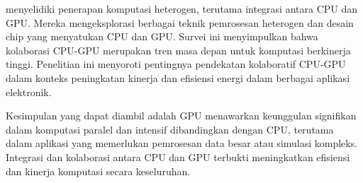 \cite{buiHeterogeneousComputingRealWorld2021} menyelidiki penerapan komputasi heterogen,
terutama integrasi antara CPU dan GPU. Mereka mengeksplorasi berbagai teknik pemrosesan
heterogen dan desain chip yang menyatukan CPU dan GPU. Survei ini menyimpulkan
bahwa kolaborasi CPU-GPU merupakan tren masa depan untuk komputasi berkinerja
tinggi. Penelitian ini menyoroti pentingnya pendekatan kolaboratif CPU-GPU dalam
konteks peningkatan kinerja dan efisiensi energi dalam berbagai aplikasi elektronik.

Kesimpulan yang dapat diambil adalah GPU menawarkan keunggulan signifikan dalam
komputasi paralel dan intensif dibandingkan dengan CPU, terutama dalam aplikasi
yang memerlukan pemrosesan data besar atau simulasi kompleks. Integrasi dan
kolaborasi antara CPU dan GPU terbukti meningkatkan efisiensi dan kinerja
komputasi secara keseluruhan.





